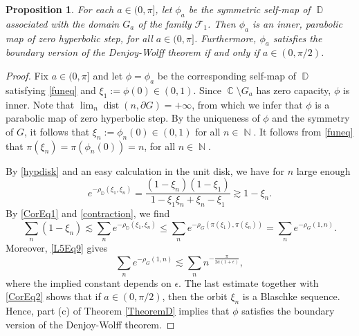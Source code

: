 \documentclass[11pt, letterpaper,leqno]{amsart}
\numberwithin{equation}{section}
\newtheorem{proposition}{Proposition}[section]
\theoremstyle{definition}
\DeclareMathOperator{\D}{\mathbb{D}}
\DeclareMathOperator{\N}{\mathbb{N}}
\DeclareMathOperator{\C}{\mathbb{C}}
\DeclareMathOperator{\dist}{\mathrm{dist}}
\begin{document}
\begin{proposition}
For each $a\in (0,\pi]$, let $\phi_a$ be the symmetric self-map of $\D$  associated with the domain $G_a$ of the family $\mathcal{F}_1$. Then $\phi_a$ is an inner, parabolic map of zero hyperbolic step, for all $a\in (0,\pi]$. Furthermore, $\phi_a$ satisfies the boundary version of the Denjoy-Wolff theorem if and only if $a\in(0,\pi/2)$.
\end{proposition}
\begin{proof}
Fix $a\in (0,\pi]$ and let $\phi=\phi_a$ be the corresponding self-map of $\D$ satisfying \eqref{funeq} and $\xi_1:=\phi(0)\in (0,1)$. Since $\C\setminus G_a$ has zero capacity,  $\phi$ is inner. Note that $\lim_{n}\dist(n,\partial G)=+\infty$, from which we infer that $\phi$ is a parabolic map of zero hyperbolic step. By the uniqueness of $\phi$ and the symmetry of $G$, it follows that $\xi_n:=\phi_n(0)\in (0,1)$ for all $n\in \N$. It follows from \eqref{funeq}  that $\pi(\xi_n)=\pi(\phi_n(0))=n$, for all $n\in\N$. 

 By \eqref{hypdisk} and an easy calculation in the unit disk,  we have for $n$ large enough
\begin{equation}\label{CorEq1}
e^{-\rho_{\D}(\xi_1,\xi_n)}=\frac{(1-\xi_n)(1-\xi_1)}{1-\xi_1\xi_n+\xi_n-\xi_1}\gtrsim 1-\xi_n.
\end{equation}
By \eqref{CorEq1} and \eqref{contraction}, we find
\begin{equation}\label{CorEq2}
\sum_n\left(1-\xi_n\right)\lesssim \sum_n e^{-\rho_{\D}(\xi_1,\xi_n)}\leq \sum_n e^{-\rho_G(\pi(\xi_1),\pi(\xi_n))}=\sum_n e^{-\rho_G(1, n)}.
\end{equation}
Moreover,  \eqref{L5Eq9} gives
\[
\sum_n e^{-\rho_G(1, n)}\lesssim \sum_n n^{-\frac{\pi}{2a(1+\epsilon)}},
\]
where the implied constant depends on $\epsilon$. The last estimate together with \eqref{CorEq2} shows that if $a\in (0,\pi/2)$, then the orbit $\xi_n$ is a Blaschke sequence. Hence, part (c) of Theorem \ref{TheoremD} implies that $\phi$ satisfies the boundary version of the Denjoy-Wolff theorem.


\end{proof}
\end{document}
